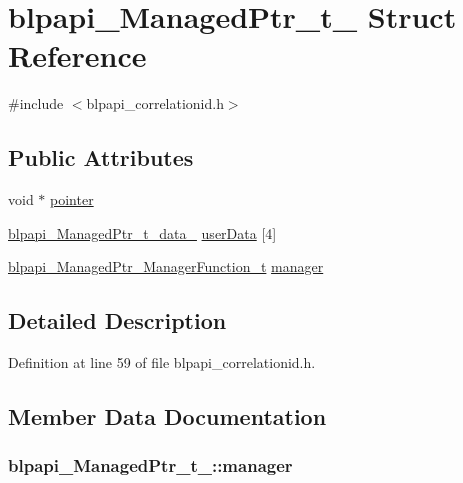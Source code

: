 \hypertarget{structblpapi___managed_ptr__t__}{}\section{blpapi\+\_\+\+Managed\+Ptr\+\_\+t\+\_\+ Struct Reference}
\label{structblpapi___managed_ptr__t__}


{\ttfamily \#include $<$blpapi\+\_\+correlationid.\+h$>$}

\subsection*{Public Attributes}
\begin{DoxyCompactItemize}
\item 
void $\ast$ \hyperlink{structblpapi___managed_ptr__t___af5a90f9f34e8ebb8465b1d1d47efd70f}{pointer}
\item 
\hyperlink{unionblpapi___managed_ptr__t__data__}{blpapi\+\_\+\+Managed\+Ptr\+\_\+t\+\_\+data\+\_\+} \hyperlink{structblpapi___managed_ptr__t___a710c979ff6ce427bd77443520ea4731e}{user\+Data} \mbox{[}4\mbox{]}
\item 
\hyperlink{blpapi__correlationid_8h_ae1d7fd8d61a6846ac85b552b72687770}{blpapi\+\_\+\+Managed\+Ptr\+\_\+\+Manager\+Function\+\_\+t} \hyperlink{structblpapi___managed_ptr__t___a163e0d9d559bac0781107a7cb2369b74}{manager}
\end{DoxyCompactItemize}


\subsection{Detailed Description}


Definition at line 59 of file blpapi\+\_\+correlationid.\+h.



\subsection{Member Data Documentation}
\subsubsection[{\texorpdfstring{manager}{manager}}]{ blpapi\+\_\+\+Managed\+Ptr\+\_\+t\+\_\+\+::manager}\hypertarget{structblpapi___managed_ptr__t___a163e0d9d559bac0781107a7cb2369b74}{}\label{structblpapi___managed_ptr__t___a163e0d9d559bac0781107a7cb2369b74}


